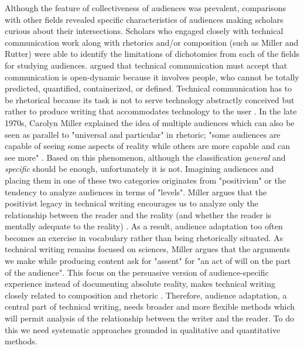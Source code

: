 Although the feature of collectiveness of audiences was prevalent, comparisons with other fields revealed specific characteristics of audiences making scholars curious about their intersections. Scholars who engaged closely with technical communication work along with rhetorics and/or composition (such as Miller and Rutter) were able to identify the limitations of dichotomies from each of the fields for studying audiences. \textcite{rutter1991history} argued that technical communication must accept that communication is open-dynamic because it involves people, who cannot be totally predicted, quantified, containerized, or defined. Technical communication has to be rhetorical because its task is not to serve technology abstractly conceived but rather to produce writing that accommodates technology to the user \cite{rutter1991history}. In the late 1970s, Carolyn Miller explained the idea of multiple audiences which can also be seen as parallel to "universal and particular" in rhetoric; "some audiences are capable of seeing some aspects of reality while others are more capable and can see more" \cite{miller1979humanistic}. Based on this phenomenon, although the classification \textit{general} and \textit{specific} should be enough, unfortunately it is not. Imagining audiences and placing them in one of these two categories originates from "positivism" or the tendency to analyze audiences in terms of "levels". Miller argues that the positivist legacy in technical writing encourages us to analyze only the relationship between the reader and the reality (and whether the reader is mentally adequate to the reality) \cite{miller1979humanistic}. As a result, audience adaptation too often becomes an exercise in vocabulary rather than being rhetorically situated. As technical writing remains focused on sciences, Miller argues that the arguments we make while producing content ask for "assent" for "an act of will on the part of the audience". This focus on the persuasive version of audience-specific experience instead of documenting absolute reality, makes technical writing closely related to composition and rhetoric \cite{miller1979humanistic}. Therefore, audience adaptation, a central part of technical writing, needs broader and more flexible methods which will permit analysis of the relationship between the writer and the reader. To do this we need systematic approaches grounded in qualitative and quantitative methods.

